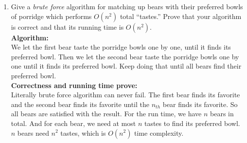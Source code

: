\documentclass[10pt]{article}
\begin{document}
\begin{enumerate}
    \item Give a {\em brute force} algorithm for matching up bears with their preferred bowls of porridge which performs $O(n^2)$ total ``tastes.'' Prove that your algorithm is correct and that its running time is $O(n^2)$.\\
    \textbf{Algorithm:}\\
    We let the first bear taste the porridge bowls one by one, until it finds its preferred bowl. Then we let the second bear taste the porridge bowls one by one until it finds its preferred bowl. Keep doing that until all bears find their preferred bowl.\\
    \textbf{Correctness and running time prove:}\\
    Literally brute force algorithm can never fail. The first bear finds its favorite and the second bear finds its favorite until the $n_{th}$ bear finds its favorite. So all bears are satisfied with the result. For the run time, we have $n$ bears in total. And for each bear, we need at most $n$ tastes to find its preferred bowl. $n$ bears need $n^2$ tastes, which is $O(n^2)$ time complexity.\\
    

\end{enumerate}
\end{document}
